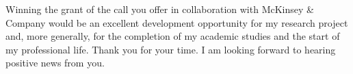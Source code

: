 \documentclass[11pt, a4paper]{dogear-cv}
\begin{document}
\begin{cvletter}
Winning the grant of the call you offer in collaboration with McKinsey \& Company would be an excellent development opportunity for my research project and, more generally, for the completion of my academic studies and the start of my professional life.
Thank you for your time. I am looking forward to hearing positive news from you.

\end{cvletter}


\makeletterclosing
\end{document}

